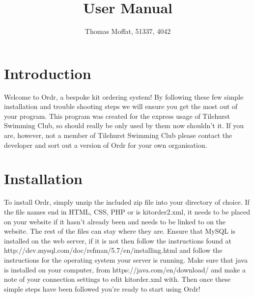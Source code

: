 \documentclass[11pt]{report}
\title{\textbf{User Manual}}
\author{Thomas Moffat, 51337, 4042}
\begin{document}
\maketitle
\tableofcontents
\newpage 
\section{Introduction}
Welcome to Ordr, a bespoke kit ordering system! By following these few simple installation and trouble shooting steps we will ensure you get the most out of your program. This program was created for the express usage of Tilehurst Swimming Club, so should really be only used by them now shouldn't it. If you are, however, not a member of Tilehurst Swimming Club please contact the developer and sort out a version of Ordr for your own organisation. 
\section{Installation}
	To install Ordr, simply unzip the included zip file into your directory of choice. If the file names end in HTML, CSS, PHP or is kitorder2.xml, it needs to be placed on your website if it hasn't already been and needs to be linked to on the website. The rest of the files can stay where they are. Ensure that MySQL is installed on the web server, if it is not then follow the instructions found at http://dev.mysql.com/doc/refman/5.7/en/installing.html and follow the instructions for the operating system your server is running. Make sure that java is installed on your computer, from https://java.com/en/download/ and make a note of your connection settings to edit kitorder.xml with. Then once these simple steps have been followed you're ready to start using Ordr!
\end{document}
